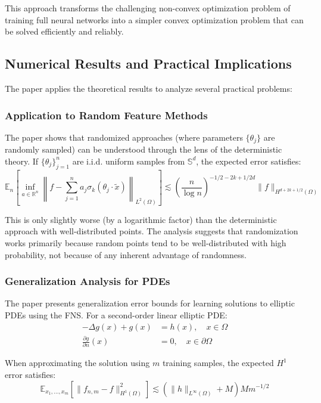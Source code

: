 \documentclass[11pt]{article}
\begin{document}
This approach transforms the challenging non-convex optimization problem of training full neural networks into a simpler convex optimization problem that can be solved efficiently and reliably.

\subsection{Numerical Results and Practical Implications}

The paper applies the theoretical results to analyze several practical problems:

\subsubsection{Application to Random Feature Methods}

The paper shows that randomized approaches (where parameters $\{\theta_j\}$ are randomly sampled) can be understood through the lens of the deterministic theory. If $\{\theta_j\}_{j=1}^n$ are i.i.d. uniform samples from $\mathbb{S}^d$, the expected error satisfies:
\begin{equation}
\mathbb{E}_n\left[\inf_{a \in \mathbb{R}^n} \left\|f - \sum_{j=1}^n a_j \sigma_k(\theta_j \cdot \tilde{x})\right\|_{L^2(\Omega)}\right] \lesssim \left(\frac{n}{\log n}\right)^{-1/2-2k+1/2d} \|f\|_{H^{d+2k+1/2}(\Omega)}
\end{equation}

This is only slightly worse (by a logarithmic factor) than the deterministic approach with well-distributed points. The analysis suggests that randomization works primarily because random points tend to be well-distributed with high probability, not because of any inherent advantage of randomness.

\subsubsection{Generalization Analysis for PDEs}

The paper presents generalization error bounds for learning solutions to elliptic PDEs using the FNS. For a second-order linear elliptic PDE:
\begin{align}
-\Delta g(x) + g(x) &= h(x), \quad x \in \Omega \\
\frac{\partial g}{\partial n}(x) &= 0, \quad x \in \partial\Omega
\end{align}

When approximating the solution using $m$ training samples, the expected $H^1$ error satisfies:
\begin{equation}
\mathbb{E}_{x_1,\ldots,x_m}[\|f_{n,m} - f\|^2_{H^1(\Omega)}] \lesssim (\|h\|_{L^\infty(\Omega)} + M)M m^{-1/2}
\end{equation}
\end{document}
